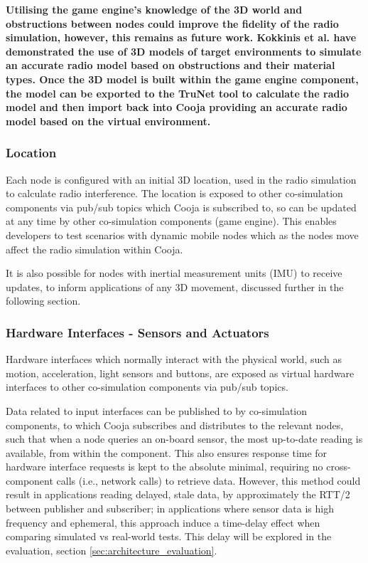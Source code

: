 \textbf{Utilising the game engine's knowledge of the 3D world and obstructions between nodes could improve the fidelity of the radio simulation, however, this remains as future work. Kokkinis et al.\cite{trunetWireless} have demonstrated the use of 3D models of target environments to simulate an accurate radio model based on obstructions and their material types. Once the 3D model is built within the game engine component, the model can be exported to the TruNet tool to calculate the radio model and then import back into Cooja providing an accurate radio model based on the virtual environment.}


\subsubsection{Location} %
\label{ssub:location}

Each node is configured with an initial 3D location, used in the radio simulation to calculate radio interference. The location is exposed to other co-simulation components via pub/sub topics which Cooja is subscribed to, so can be updated at any time by other co-simulation components (game engine). This enables developers to test scenarios with dynamic mobile nodes which as the nodes move affect the radio simulation within Cooja.

It is also possible for nodes with inertial measurement units (IMU) to receive updates, to inform applications of any 3D movement, discussed further in the following section.

\subsubsection{Hardware Interfaces - Sensors and Actuators} %
\label{ssub:hardware_interfaces_sensors}

Hardware interfaces which normally interact with the physical world, such as motion, acceleration, light sensors and buttons, are exposed as virtual hardware interfaces to other co-simulation components via pub/sub topics.


Data related to input interfaces can be published to by co-simulation components, to which Cooja subscribes and distributes to the relevant nodes, such that when a node queries an on-board sensor, the most up-to-date reading is available, from within the component. This also ensures response time for hardware interface requests is kept to the absolute minimal, requiring no cross-component calls (i.e., network calls) to retrieve data. However, this method could result in applications reading delayed, stale data, by approximately the RTT/2 between publisher and subscriber; in applications where sensor data is high frequency and ephemeral, this approach induce a time-delay effect when comparing simulated vs real-world tests. This delay will be explored in the evaluation, section \ref{sec:architecture_evaluation}. 

